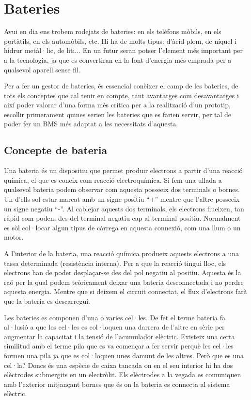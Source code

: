 \chapter{Bateries}
\label{chap:Bateries}

Avui en dia ens trobem rodejats de bateries: en els telèfons mòbils, en els portàtils, en els automòbils, etc. Hi ha de molts tipus: d'àcid-plom, de níquel i hidrur metàl·lic, de liti... En un futur seran potser l'element més important per a la tecnologia, ja que es convertiran en la font d'energia més emprada per a qualsevol aparell sense fil. 

Per a fer un gestor de bateries, és essencial conèixer el camp de les bateries, de tots els conceptes que cal tenir en compte, tant avantatges com desavantatges i així poder valorar d'una forma més crítica per a la realització d'un prototip, escollir primerament quines serien les bateries que es farien servir, per tal de poder fer un BMS més adaptat a les necessitats d'aquesta. 

\section{Concepte de bateria}

Una bateria és un dispositiu que permet produir electrons a partir d’una reacció química, el que es coneix com reacció electroquímica. Si fem una ullada a qualsevol bateria podem observar com aquesta posseeix dos terminals o bornes. Un d’ells sol estar marcat amb un signe positiu “+” mentre que l’altre posseeix un signe negatiu “-”. Al cablejar aquests dos terminals, els electrons flueixen, tan ràpid com poden, des del terminal negatiu cap al terminal positiu. Normalment es sòl col·locar algun tipus de càrrega en aquesta connexió, com una llum o un motor.

A l’interior de la bateria, una reacció química produeix aquests electrons a una tassa determinada (resistència interna). Per a que la reacció tingui lloc, els electrons han de poder desplaçar-se des del pol negatiu al positiu. Aquesta és la raó per la qual podem teòricament deixar una bateria desconnectada i no perdre aquesta energia. Mentre que si deixem el circuit connectat, el flux d’electrons farà que la bateria es descarregui.

Les bateries es componen d’una o varies cel·les. De fet el terme bateria fa al·lusió a que les cel·les es col·loquen una darrera de l’altre en sèrie per augmentar la capacitat i la tensió de l’acumulador elèctric. Existeix una certa similitud amb el terme pila que es va començar a fer servir perquè les cel·les formen una pila ja que es col·loquen unes damunt de les altres. Però que es una cel·la? Doncs és una espècie de caixa tancada on en el seu interior hi ha dos elèctrodes submergits en un electròlit. Els elèctrodes a la vegada es comuniquen amb l’exterior mitjançant bornes que és on la bateria es connecta al sistema elèctric.

